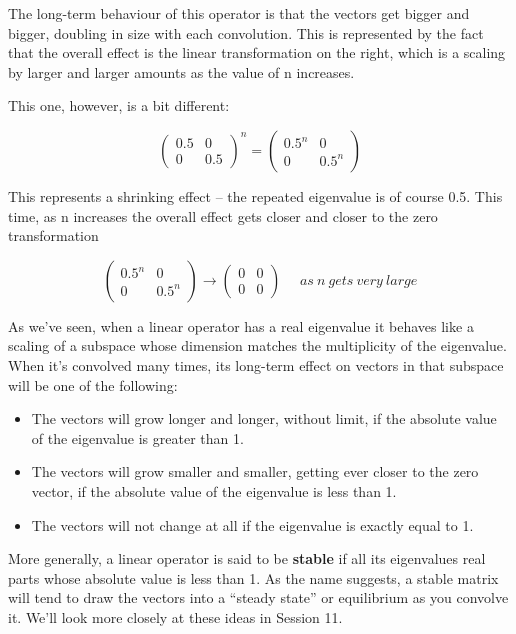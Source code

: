 \documentclass[oneside,english]{amsbook}
\numberwithin{section}{chapter}
\theoremstyle{plain}
\theoremstyle{definition}
\begin{document}
The long-term behaviour of this operator is that the vectors get bigger
and bigger, doubling in size with each convolution. This is represented
by the fact that the overall effect is the linear transformation on the
right, which is a scaling by larger and larger amounts as the value of n
increases.

This one, however, is a bit different:

\[\begin{pmatrix}
	0.5 & 0 \\
	0 & 0.5
\end{pmatrix}^{n} = \begin{pmatrix}
	{0.5}^{n} & 0 \\
	0 & {0.5}^{n}
\end{pmatrix}\]

This represents a shrinking effect -- the repeated eigenvalue is of
course 0.5. This time, as n increases the overall effect gets closer and
closer to the zero transformation

\[\begin{pmatrix}
	{0.5}^{n} & 0 \\
	0 & {0.5}^{n}
\end{pmatrix} \rightarrow \begin{pmatrix}
	0 & 0 \\
	0 & 0
\end{pmatrix}\ \ \ \ \ \ as\ n\ gets\ very\ large\]

As we've seen, when a linear operator has a real eigenvalue it behaves
like a scaling of a subspace whose dimension matches the multiplicity of
the eigenvalue. When it's convolved many times, its long-term effect on
vectors in that subspace will be one of the following:

\begin{itemize}
	\item
	The vectors will grow longer and longer, without limit, if the
	absolute value of the eigenvalue is greater than 1.
	\item
	The vectors will grow smaller and smaller, getting ever closer to the
	zero vector, if the absolute value of the eigenvalue is less than 1.
	\item
	The vectors will not change at all if the eigenvalue is exactly equal
	to 1.
\end{itemize}

More generally, a linear operator is said to be \textbf{stable} if all
its eigenvalues real parts whose absolute value is less than 1. As the
name suggests, a stable matrix will tend to draw the vectors into a
``steady state'' or equilibrium as you convolve it. We'll look more
closely at these ideas in Session 11.
\end{document}
